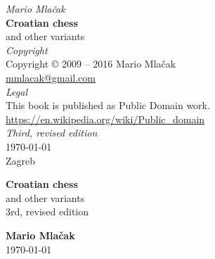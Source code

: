 \documentclass[a5paper,12pt,draft]{book}
\begin{document}
\thispagestyle{empty}
\vspace*{0.1\textheight}
\begin{center}
    \emph{Mario Mlačak} \\
    \textbf{Croatian chess} \\
    and other variants \\ [2.0em]

    \emph{Copyright} \\
    Copyright \copyright \hspace{0.2ex} 2009 -- 2016 Mario Mlačak \\
    \href{mailto:mmlacak@gmail.com}{mmlacak@gmail.com} \\ [2.0em]

    \emph{Legal} \\
    This book is published as Public Domain work. \\
    \href{https://en.wikipedia.org/wiki/Public\_domain}{https://en.wikipedia.org/wiki/Public\_domain} \\ [2.0em]

    \emph{Third, revised edition} \\
    \today \\
    Zagreb

    \vfill

    \LaTeXe
    \vspace{0.1\textheight}
\end{center}
\clearpage

\thispagestyle{empty}
\vspace*{0.2\textheight}
\begin{center}
    \textbf{\Large{Croatian chess}} \\ [1.0em]
    \large{and other variants} \\ [1.0em]
    \small{3rd, revised edition} \\ [2.0cm]
    \vspace*{0.2\textheight}

    \textbf{\large{Mario Mlačak}} \\ [1.0em]
    \small{\today} %
\end{center}
\clearpage

\thispagestyle{empty}
\vspace*{0.1\textheight}
\clearpage
\end{document}
